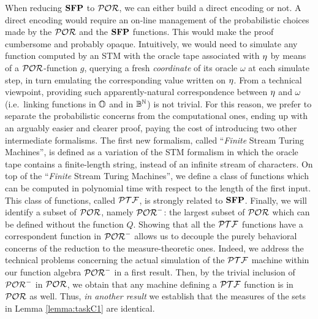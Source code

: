 \noindent
When reducing $\mathbf{SFP}$ to $\mathcal{POR}$, we can either build
a direct encoding or not. A direct encoding would require
an on-line management of the probabilistic choices made by
the $\mathcal{POR}$ and the $\mathbf{SFP}$ functions.
This would make the proof cumbersome and probably opaque.
Intuitively, we would need to simulate any function computed
by an STM with the oracle tape associated with
$\textcolor{black}{\eta}$
by means of a
$\mathcal{POR}$-function $g$,
querying a fresh \emph{coordinate} of its
oracle $\omega$ at each simulate step,
in turn emulating
the corresponding value written
on $\textcolor{black}{\eta}$.
From a technical viewpoint, providing such
apparently-natural correspondence between
$\textcolor{black}{\eta}$ and $\omega$ (i.e.~linking functions
in $\mathbb{O}$ and in $\mathbb{B}^{\mathbb{N}}$)
is not trivial.
%
For this reason, we prefer to separate the probabilistic concerns from
the computational ones, ending up with an arguably easier and clearer proof,
paying the cost of introducing two other intermediate formalisms.
%
The first new formalism, called ``\emph{Finite} Stream Turing Machines'',
is defined as a variation of the STM formalism in which the oracle
tape contains a finite-length string, instead of an infinite stream of
characters.
%
On top of the ``\emph{Finite} Stream Turing Machines'', we define a
class of functions which can be computed in polynomial time with
respect to the length of the first input. This class of functions, called $\mathcal{PTF}$, is
strongly related to $\mathbf{SFP}$.
%
Finally, we will identify a subset of $\mathcal{POR}$, namely $\mathcal{POR}^-$:
the largest subset of $\mathcal{POR}$ which can be defined without
the function $Q$. Showing that all the $\mathcal{PTF}$
functions have a correspondent function in $\mathcal{POR}^-$ allows us to
decouple the purely behavioral concerns of the reduction to the
measure-theoretic ones.
%
Indeed, we address the technical problems concerning the actual simulation
of the $\mathcal{PTF}$ machine within our function algebra $\mathcal{POR}^-$ in a first result.
Then, by the trivial inclusion of $\mathcal{POR}^-$ in $\mathcal{POR}$, we obtain that any machine
defining a $\mathcal{PTF}$ function is in $\mathcal{POR}$ as well. Thus, \emph{in another result}
we establish that the measures of the sets in Lemma \ref{lemma:taskC1} are identical.





